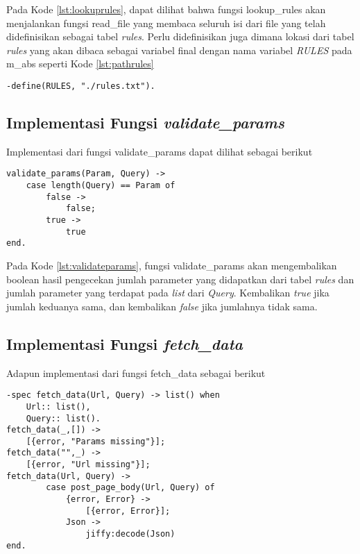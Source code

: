 Pada Kode \ref{lst:lookuprules}, dapat dilihat bahwa fungsi lookup\_rules akan menjalankan fungsi read\_file yang membaca seluruh isi dari file yang telah didefinisikan sebagai tabel \textit{rules}. Perlu didefinisikan juga dimana lokasi dari tabel \textit{rules} yang akan dibaca sebagai variabel final dengan nama variabel \textit{RULES} pada m\_abs seperti Kode \ref{lst:pathrules}
\begin{minipage}{\linewidth}
\begin{lstlisting}[caption={lokasi dari \textit{file} rules.txt},label={lst:pathrules}]
-define(RULES, "./rules.txt").
\end{lstlisting}
\end{minipage}

\subsection{Implementasi Fungsi \textit{validate\_params}}

Implementasi dari fungsi validate\_params dapat dilihat sebagai berikut
\begin{minipage}{\linewidth}
\begin{lstlisting}[caption={Implementasi fungsi validate\_params},label={lst:validateparams}]
validate_params(Param, Query) ->
	case length(Query) == Param of
		false ->
			false;
		true ->
			true
end.
\end{lstlisting}
\end{minipage}

Pada Kode \ref{lst:validateparams}, fungsi validate\_params akan mengembalikan boolean hasil pengecekan jumlah parameter yang didapatkan dari tabel \textit{rules} dan jumlah parameter yang terdapat pada \textit{list} dari \textit{Query}. Kembalikan \textit{true} jika jumlah keduanya sama, dan kembalikan \textit{false} jika jumlahnya tidak sama.

\subsection{Implementasi Fungsi \textit{fetch\_data}}

Adapun implementasi dari fungsi fetch\_data sebagai berikut

\begin{minipage}{\linewidth}
\begin{lstlisting}[caption={Implementasi fungsi fetch\_data},label={lst:fetchdata}]
-spec fetch_data(Url, Query) -> list() when
	Url:: list(),
    Query:: list().
fetch_data(_,[]) ->
    [{error, "Params missing"}];
fetch_data("",_) ->
	[{error, "Url missing"}];
fetch_data(Url, Query) ->
	    case post_page_body(Url, Query) of
	        {error, Error} ->
	            [{error, Error}];
	        Json ->     
	            jiffy:decode(Json)
end.
\end{lstlisting}
\end{minipage}


